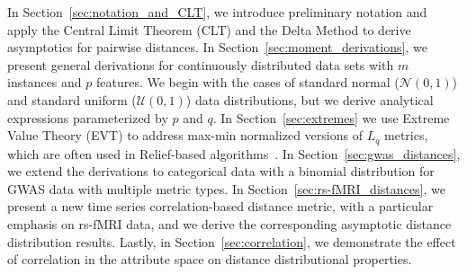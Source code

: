 \documentclass[aoas]{imsart}
\begin{document}
In Section~\ref{sec:notation_and_CLT}, we introduce preliminary notation and apply the Central Limit Theorem (CLT) and the Delta Method to derive asymptotics for pairwise distances. In Section~\ref{sec:moment_derivations}, we present general derivations for continuously distributed data sets with $m$ instances and $p$ features. We begin with the cases of standard normal ($\mathcal{N}(0,1)$) and standard uniform ($\mathcal{U}(0,1)$) data distributions, but we derive analytical expressions parameterized by $p$ and $q$. In Section~\ref{sec:extremes} we use Extreme Value Theory (EVT) to address max-min normalized versions of $L_q$ metrics, which are often used in Relief-based algorithms~\cite{robnik2003}. In Section~\ref{sec:gwas_distances}, we extend the derivations to categorical data with a binomial distribution for GWAS data with multiple metric types. In Section~\ref{sec:rs-fMRI_distances}, we present a new time series correlation-based distance metric, with a particular emphasis on rs-fMRI data, and we derive the corresponding asymptotic distance distribution results. Lastly, in Section~\ref{sec:correlation}, we demonstrate the effect of correlation in the attribute space on distance distributional properties. 
\end{document}
